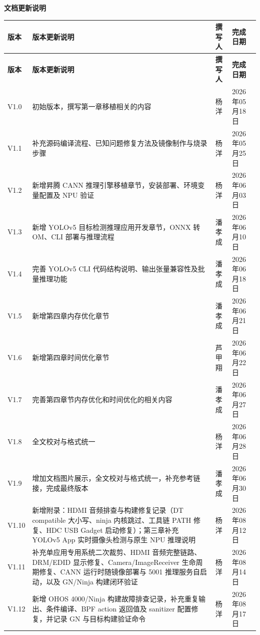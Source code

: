 
\clearpage
\thispagestyle{plain}

\vspace{1cm}

\begin{center}
{\fontsize{18bp}{22bp}\sffamily\bfseries 文档更新说明}
\end{center}

\vspace{1cm}

\renewcommand\arraystretch{1.8}
\begin{longtable}{|>{\centering\arraybackslash}m{2cm}|>{\centering\arraybackslash}m{7cm}|>{\centering\arraybackslash}m{2.5cm}|>{\centering\arraybackslash}m{2.5cm}|}
\hline
\textbf{版本} & \textbf{版本更新说明} & \textbf{撰写人} & \textbf{完成日期} \\
\hline
\endfirsthead
\hline
\textbf{版本} & \textbf{版本更新说明} & \textbf{撰写人} & \textbf{完成日期} \\
\hline
\endhead
\hline
\endfoot

V1.0 & 初始版本，撰写第一章移植相关的内容 & 杨洋 & 2026年05月18日 \\
\hline
V1.1 & 补充源码编译流程、已知问题修复方法及镜像制作与烧录步骤 & 杨洋 & 2026年05月25日 \\
\hline
V1.2 & 新增昇腾 CANN 推理引擎移植章节，安装部署、环境变量配置及 NPU 验证 & 杨洋 & 2026年06月03日 \\
\hline
V1.3 & 新增 YOLOv5 目标检测推理应用开发章节，ONNX 转 OM、CLI 部署与推理流程 & 潘孝成 & 2026年06月10日 \\
\hline
V1.4 & 完善 YOLOv5 CLI 代码结构说明、输出张量兼容性及批量推理功能 & 潘孝成 & 2026年06月18日 \\
\hline
V1.5 & 新增第四章内存优化章节 & 潘孝成 & 2026年06月21日 \\
\hline
V1.6 & 新增第四章时间优化章节 & 芦甲翔 & 2026年06月22日 \\
\hline
V1.7 & 完善第四章节内存优化和时间优化的相关内容 & 潘孝成 & 2026年06月27日 \\
\hline
V1.8 & 全文校对与格式统一 & 杨洋 & 2026年06月28日 \\
\hline
V1.9 & 增加文档图片展示，全文校对与格式统一，补充参考链接，完成最终版本 & 潘孝成 & 2026年06月30日 \\
\hline
V1.10 & 新增附录：HDMI 音频排查与构建修复记录（DT compatible 大小写、ninja 内核跳过、工具链 PATH 修复、HDC USB Gadget 启动修复）；第三章补充 YOLOv5 App 实时摄像头检测与原生 NPU 推理说明 & 杨洋 & 2026年08月12日 \\
\hline
V1.11 & 补充单应用专用系统二次裁剪、HDMI 音频完整链路、DRM/EDID 显示修复、Camera/ImageReceiver 生命周期修复、CANN 运行时随镜像部署与 5001 推理服务自启动，以及 GN/Ninja 构建闭环验证 & 杨洋 & 2026年08月14日 \\
\hline
V1.12 & 新增 OHOS 4000/Ninja 构建故障排查记录，补充重复输出、条件编译、BPF action 返回值及 sanitizer 配置修复，并记录 GN 与目标构建验证命令 & 杨洋 & 2026年08月17日 \\
\hline
\end{longtable}
